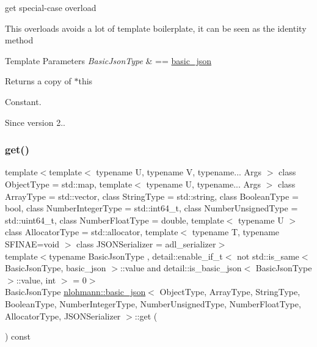 get special-\/case overload 

This overloads avoids a lot of template boilerplate, it can be seen as the identity method


\begin{DoxyTemplParams}{Template Parameters}
{\em Basic\+Json\+Type} & == \mbox{\hyperlink{classnlohmann_1_1basic__json}{basic\+\_\+json}}\\
\hline
\end{DoxyTemplParams}
\begin{DoxyReturn}{Returns}
a copy of $\ast$this
\end{DoxyReturn}
Constant.

\begin{DoxySince}{Since}
version 2.. 
\end{DoxySince}
\mbox{\label{classnlohmann_1_1basic__json_a30ff63a4d671eb14f652356cd934320c}} 
\subsubsection{\texorpdfstring{get()}{get()}\hspace{0.1cm}{\footnotesize\ttfamily [2/6]}}
{\footnotesize\ttfamily template$<$template$<$ typename U, typename V, typename... Args $>$ class Object\+Type = std\+::map, template$<$ typename U, typename... Args $>$ class Array\+Type = std\+::vector, class String\+Type  = std\+::string, class Boolean\+Type  = bool, class Number\+Integer\+Type  = std\+::int64\+\_\+t, class Number\+Unsigned\+Type  = std\+::uint64\+\_\+t, class Number\+Float\+Type  = double, template$<$ typename U $>$ class Allocator\+Type = std\+::allocator, template$<$ typename T, typename S\+F\+I\+N\+A\+E=void $>$ class J\+S\+O\+N\+Serializer = adl\+\_\+serializer$>$ \\
template$<$typename Basic\+Json\+Type , detail\+::enable\+\_\+if\+\_\+t$<$ not std\+::is\+\_\+same$<$ Basic\+Json\+Type, basic\+\_\+json $>$\+::value and detail\+::is\+\_\+basic\+\_\+json$<$ Basic\+Json\+Type $>$\+::value, int $>$  = 0$>$ \\
Basic\+Json\+Type \mbox{\hyperlink{classnlohmann_1_1basic__json}{nlohmann\+::basic\+\_\+json}}$<$ Object\+Type, Array\+Type, String\+Type, Boolean\+Type, Number\+Integer\+Type, Number\+Unsigned\+Type, Number\+Float\+Type, Allocator\+Type, J\+S\+O\+N\+Serializer $>$\+::get (\begin{DoxyParamCaption}{ }\end{DoxyParamCaption}) const\hspace{0.3cm}{\ttfamily [inline]}}



